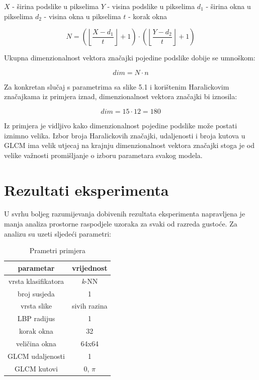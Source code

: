 \documentclass[times, utf8, zavrsni]{fer}
\begin{document}
\begin{center}

\(X\) - širina podslike u pikselima
\(Y\) - visina podslike u pikselima
\(d_1\) - širina okna u pikselima
\(d_2\) - visina okna u pikselima
\(t\) - korak okna

\[
N = \left(\left\lfloor\frac{X-d_1}{t}\right\rfloor + 1\right) \cdot
\left(\left\lfloor\frac{Y-d_2}{t}\right\rfloor + 1\right)
\]

Ukupna dimenzionalnost vektora značajki pojedine podslike dobije se umnoškom:

\[
dim = N \cdot n
\]

Za konkretan slučaj s parametrima sa slike 5.1 i korištenim Haralickovim 
značajkama iz primjera iznad, dimenzionalnost vektora značajki bi iznosila:

\[
dim = 15 \cdot 12 = 180
\]

\end{center}

Iz primjera je vidljivo kako dimenzionalnost pojedine podslike može postati
iznimno velika. Izbor broja Haralickovih značajki, udaljenosti i broja kutova u 
GLCM ima velik utjecaj na krajnju dimenzionalnost vektora značajki stoga je
od velike važnosti promišljanje o izboru parametara svakog modela. 


\chapter{Rezultati eksperimenta}

U svrhu boljeg razumijevanja dobivenih rezultata eksperimenta napravljena je manja  analiza
prostorne raspodjele uzoraka za svaki od razreda gustoće. Za analizu su uzeti sljedeći parametri:

\begin{table}[ht]
\centering
\begin{tabular}{c|c}
parametar & vrijednost \\
\hline
vrsta klasifikatora & \textit{k}-NN \\
broj susjeda & 1 \\
vrsta slike & sivih razina \\
LBP radijus & 1 \\
korak okna & 32 \\
veličina okna & 64x64 \\
GLCM udaljenosti & 1 \\
GLCM kutovi & 0, \(\pi\) \\
\end{tabular}
\caption{Prametri primjera} 
\end{table}
\end{document}
